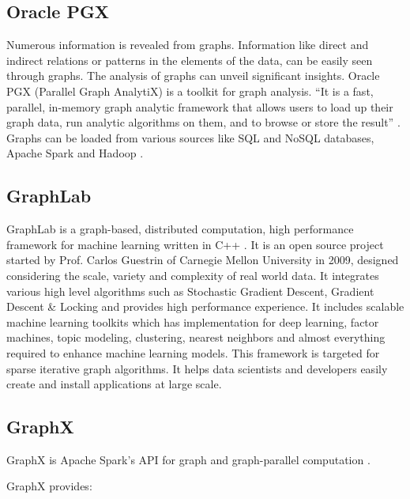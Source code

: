    \pv
    
\subsection{Oracle PGX}

    Numerous information is revealed from graphs. Information like
    direct and indirect relations or patterns in the elements of the
    data, can be easily seen through graphs. The analysis of graphs
    can unveil significant insights. Oracle PGX (Parallel Graph
    AnalytiX) is a toolkit for graph analysis.  ``It is a fast,
    parallel, in-memory graph analytic framework that allows users to
    load up their graph data, run analytic algorithms on them, and to
    browse or store the result'' \cite{www-pgx}. Graphs can be loaded
    from various sources like SQL and NoSQL databases, Apache Spark
    and Hadoop \cite{www-ora}.
    
\subsection{GraphLab}

    GraphLab is a graph-based, distributed
    computation, high performance framework for machine learning
    written in C++ \cite{www-graphlab}. It is an open source project started by
    Prof. Carlos Guestrin of Carnegie Mellon University in 2009,
    designed considering the scale, variety and complexity of real
    world data. It integrates various high level algorithms such as
    Stochastic Gradient Descent, Gradient Descent \& Locking and
    provides high performance experience. It includes scalable machine
    learning toolkits which has implementation for deep learning,
    factor machines, topic modeling, clustering, nearest neighbors and
    almost everything required to enhance machine learning
    models. This framework is targeted for sparse iterative graph
    algorithms. It helps data scientists and developers easily create
    and install applications at large scale.

    \pv
    
\subsection{GraphX}

    GraphX is Apache Spark's API for graph and graph-parallel
    computation \cite{www-graphX}.
	  
    GraphX provides:
    
